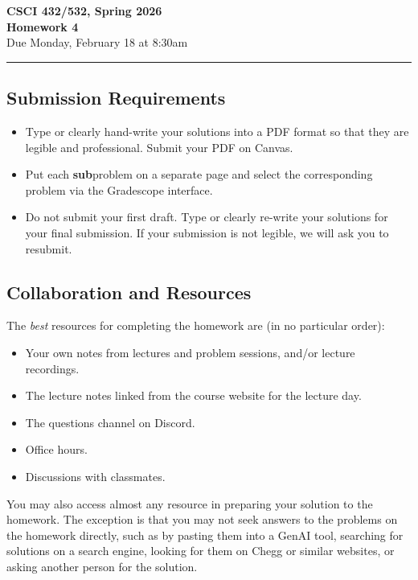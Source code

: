 \documentclass[11pt]{article}
\begin{document}
\begin{center}
\Large\textbf{CSCI 432/532, Spring 2026}%
\\
\LARGE\textbf{Homework 4}%
\\[0.5ex]
\large Due Monday, February 18 at 8:30am
\end{center}

\bigskip
\hrule
\bigskip

\subsection*{Submission Requirements}
\begin{itemize}
    \item Type or clearly hand-write your solutions into a PDF format so that they are legible and professional. Submit your PDF on Canvas. 
	\item Put each \textbf{sub}problem on a separate page and select the corresponding problem via the Gradescope interface.
    \item Do not submit your first draft. Type or clearly re-write your solutions for your final submission. If your submission is not legible, we will ask you to resubmit.
\end{itemize}

\subsection*{Collaboration and Resources}

The \emph{best} resources for completing the homework are (in no particular order):
\begin{itemize}
	\item Your own notes from lectures and problem sessions, and/or lecture recordings.
	\item The lecture notes linked from the course website for the lecture day.
	\item The questions channel on Discord.
	\item Office hours.
	\item Discussions with classmates.
\end{itemize}
You may also access almost any resource in preparing your solution to the
homework. The exception is that you may not seek answers to the problems on the
homework directly, such as by pasting them into a GenAI tool, searching for
solutions on a search engine, looking for them on Chegg or similar websites, or
asking another person for the solution.
\end{document}
